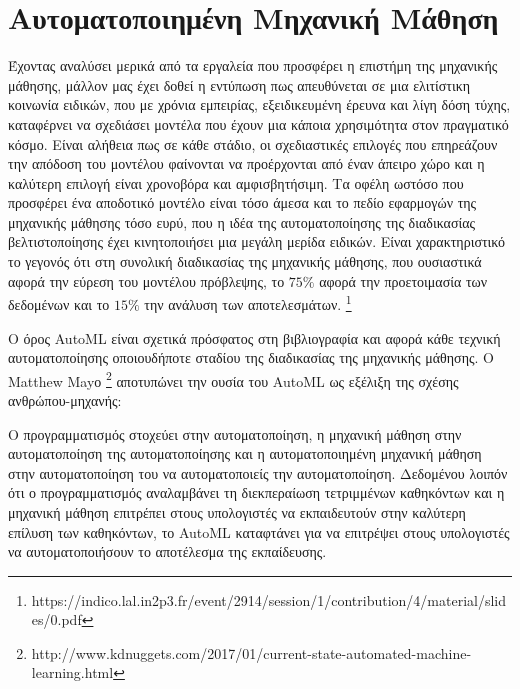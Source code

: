 \section{Αυτοματοποιημένη Μηχανική Μάθηση}
 Έχοντας αναλύσει μερικά από τα εργαλεία που προσφέρει η επιστήμη της μηχανικής μάθησης, μάλλον μας έχει δοθεί η εντύπωση πως απευθύνεται σε μια ελιτίστικη κοινωνία ειδικών, που με χρόνια εμπειρίας, εξειδικευμένη έρευνα και λίγη δόση τύχης, καταφέρνει να σχεδιάσει μοντέλα που έχουν μια κάποια χρησιμότητα στον
 πραγματικό κόσμο. Είναι αλήθεια πως σε κάθε στάδιο, οι σχεδιαστικές επιλογές που επηρεάζουν την απόδοση του μοντέλου φαίνονται να προέρχονται από έναν άπειρο χώρο και η καλύτερη επιλογή είναι χρονοβόρα και αμφισβητήσιμη. Τα οφέλη ωστόσο που προσφέρει ένα αποδοτικό μοντέλο είναι τόσο άμεσα και το πεδίο εφαρμογών της μηχανικής μάθησης τόσο ευρύ, που η ιδέα της αυτοματοποίησης της διαδικασίας βελτιστοποίησης έχει κινητοποιήσει μια μεγάλη μερίδα ειδικών. Είναι χαρακτηριστικό
 το γεγονός ότι στη συνολική διαδικασίας της μηχανικής μάθησης, που ουσιαστικά αφορά την εύρεση του μοντέλου πρόβλεψης, το $75\%$ αφορά την προετοιμασία των δεδομένων και το $15\%$ την ανάλυση των αποτελεσμάτων. \footnote{https://indico.lal.in2p3.fr/event/2914/session/1/contribution/4/material/slides/0.pdf}
 
 Ο όρος AutoML είναι σχετικά πρόσφατος στη βιβλιογραφία και αφορά κάθε τεχνική
 αυτοματοποίησης οποιουδήποτε σταδίου της διαδικασίας της μηχανικής μάθησης. Ο Matthew Mayο \footnote{http://www.kdnuggets.com/2017/01/current-state-automated-machine-learning.html} αποτυπώνει την ουσία του AutoML ως εξέλιξη της σχέσης ανθρώπου-μηχανής:
 
 \begin{displayquote}
 Ο προγραμματισμός στοχεύει στην αυτοματοποίηση, η μηχανική μάθηση στην αυτοματοποίηση της αυτοματοποίησης και η αυτοματοποιημένη μηχανική μάθηση στην αυτοματοποίηση του να αυτοματοποιείς την αυτοματοποίηση. Δεδομένου λοιπόν ότι ο προγραμματισμός αναλαμβάνει τη διεκπεραίωση τετριμμένων καθηκόντων και η μηχανική μάθηση επιτρέπει στους υπολογιστές να εκπαιδευτούν στην καλύτερη επίλυση των καθηκόντων, το AutoML καταφτάνει για να επιτρέψει στους υπολογιστές να αυτοματοποιήσουν το αποτέλεσμα της εκπαίδευσης.
 \end{displayquote}
 
